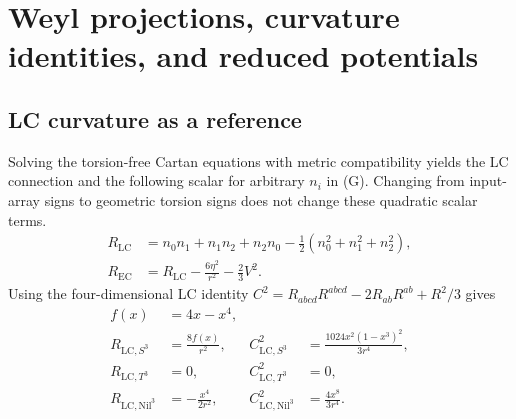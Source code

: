 \section{Weyl projections, curvature identities, and reduced potentials}
\label{sec:revised4}

\subsection{LC curvature as a reference}
Solving the torsion-free Cartan equations with metric compatibility yields the LC connection and the following scalar for arbitrary $n_i$ in (G). Changing from input-array signs to geometric torsion signs does not change these quadratic scalar terms.
\begin{equation}
\begin{aligned}
R_{\mathrm{LC}}&=n_0n_1+n_1n_2+n_2n_0
-\frac12(n_0^2+n_1^2+n_2^2),\\
R_{\mathrm{EC}}&=R_{\mathrm{LC}}-\frac{6\eta^2}{r^2}-\frac23V^2.
\end{aligned}
\tag{R}\label{eq:R}
\end{equation}
Using the four-dimensional LC identity $C^2=R_{abcd}R^{abcd}-2R_{ab}R^{ab}+R^2/3$ gives
\begin{equation}
\begin{aligned}
f(x)&=4x-x^4,\\
R_{\mathrm{LC},S^3}&=\frac{8f(x)}{r^2},
&C_{\mathrm{LC},S^3}^2&=\frac{1024x^2(1-x^3)^2}{3r^4},\\
R_{\mathrm{LC},T^3}&=0,&C_{\mathrm{LC},T^3}^2&=0,\\
R_{\mathrm{LC},\mathrm{Nil}^3}&=-\frac{x^4}{2r^2},
&C_{\mathrm{LC},\mathrm{Nil}^3}^2&=\frac{4x^8}{3r^4}.
\end{aligned}
\tag{W}\label{eq:W}
\end{equation}

